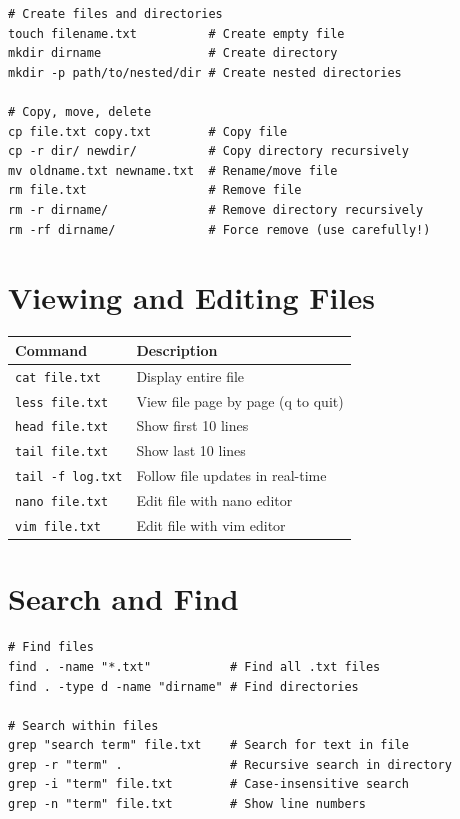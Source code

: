 \documentclass[11pt]{article}
\begin{document}
\begin{lstlisting}
# Create files and directories
touch filename.txt          # Create empty file
mkdir dirname               # Create directory
mkdir -p path/to/nested/dir # Create nested directories

# Copy, move, delete
cp file.txt copy.txt        # Copy file
cp -r dir/ newdir/          # Copy directory recursively
mv oldname.txt newname.txt  # Rename/move file
rm file.txt                 # Remove file
rm -r dirname/              # Remove directory recursively
rm -rf dirname/             # Force remove (use carefully!)
\end{lstlisting}

\section{Viewing and Editing Files}

\begin{center}
\begin{tabular}{ll}
\toprule
Command & Description \\
\midrule
\texttt{cat file.txt} & Display entire file \\
\texttt{less file.txt} & View file page by page (q to quit) \\
\texttt{head file.txt} & Show first 10 lines \\
\texttt{tail file.txt} & Show last 10 lines \\
\texttt{tail -f log.txt} & Follow file updates in real-time \\
\texttt{nano file.txt} & Edit file with nano editor \\
\texttt{vim file.txt} & Edit file with vim editor \\
\bottomrule
\end{tabular}
\end{center}

\section{Search and Find}

\begin{lstlisting}
# Find files
find . -name "*.txt"           # Find all .txt files
find . -type d -name "dirname" # Find directories

# Search within files
grep "search term" file.txt    # Search for text in file
grep -r "term" .               # Recursive search in directory
grep -i "term" file.txt        # Case-insensitive search
grep -n "term" file.txt        # Show line numbers
\end{lstlisting}
\end{document}
